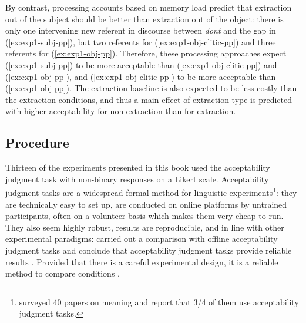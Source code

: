 By contrast, processing accounts based on memory load predict that extraction out of the subject should be better than extraction out of the object: there is only one intervening new referent in discourse between \emph{dont} and the gap in (\ref{ex:exp1-subj-pp}), but two referents for (\ref{ex:exp1-obj-clitic-pp}) and three referents for (\ref{ex:exp1-obj-pp}). Therefore, these processing approaches expect (\ref{ex:exp1-subj-pp}) to be more acceptable than (\ref{ex:exp1-obj-clitic-pp}) and (\ref{ex:exp1-obj-pp}), and (\ref{ex:exp1-obj-clitic-pp}) to be more acceptable than (\ref{ex:exp1-obj-pp}). The extraction baseline is also expected to be less costly than the extraction conditions, and thus a main effect of extraction type is predicted with higher acceptability for non-extraction than for extraction. 

\subsection{Procedure}

\label{ch:methodo-AJ}
Thirteen of the experiments presented in this book used the acceptability judgment task with non-binary responses on a Likert scale. Acceptability judgment tasks are a widespread formal method for linguistic experiments\footnote{\citet{Tonhauser.Matthewson.Ms} surveyed 40 papers on meaning and report that 3/4 of them use acceptability judgment tasks.}: they are technically easy to set up, are conducted on online platforms by untrained participants, often on a volunteer basis which makes them very cheap to run. They also seem highly robust, results are reproducible, and in line with other experimental paradigms: \citet{Pechmann.1994} carried out a comparison with offline acceptability judgment tasks and conclude that acceptability judgment tasks provide reliable results \citep[see also][]{Keller.2001,Sorace.2005,Gibson.2013}.
Provided that there is a careful experimental design, it is a reliable method to compare conditions \citep{Schutze.2016.ex1996,Tonhauser.Matthewson.Ms}.

